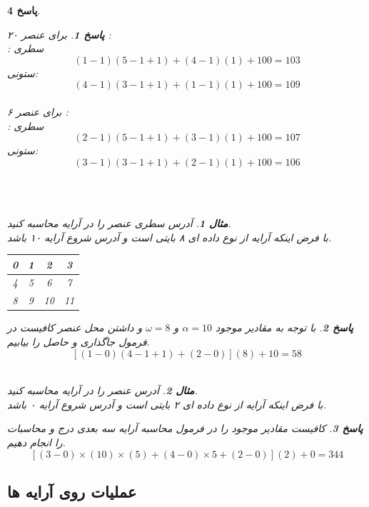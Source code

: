 \documentclass[12pt]{article}
\newtheorem{question}{مثال}[section]
\newtheorem{answer}{پاسخ}[section]
\begin{document}
\begin{answer}
\begin{answer}
برای عنصر ۲۰ :\\
سطری :
\[(1 - 1)(5 - 1 + 1) + (4 - 1)(1) + 100 = 103\]
ستونی:
\[(4 - 1)(3 - 1 + 1) + (1 - 1)(1) + 100 = 109\]\\

برای عنصر ۶ :\\
سطری :
\[(2 - 1)(5 - 1 + 1) + (3 - 1)(1) + 100 = 107\]
ستونی:
\[(3 - 1)(3 - 1 + 1) + (2- 1)(1) + 100 = 106\]\\
\end{answer}\\
\newline

\begin{question}
آدرس سطری عنصر  را در آرایه  محاسبه کنید.\\
با فرض اینکه آرایه از نوع داده ای ۸ بایتی است و آدرس شروع آرایه ۱۰ باشد.\\
\end{question}

\begin{LTR}
\begin{tabular}{|c|c|c|c|}
\hline
0 & 1 & 2 & 3  \\
\hline
4 & 5 & 6 & 7  \\
\hline
8 & 9 & 10& 11 \\
\hline
\end{tabular}
\end{LTR}

\begin{answer}
با توجه به مقادیر موجود $\alpha = 10$ و $\omega = 8$ و داشتن محل عنصر کافیست در فرمول جاگذاری و حاصل را بیابیم.\\
\[[(1 - 0)(4 - 1 + 1) + (2 - 0)](8) + 10 = 58\]\\
\end{answer}
\newline
\begin{question}
	آدرس  عنصر  را در آرایه  محاسبه کنید.\\
با فرض اینکه آرایه از نوع داده ای ۲ بایتی است و آدرس شروع آرایه ۰ باشد.
\end{question}
\begin{answer}
کافیست مقادیر موجود را در فرمول محاسبه آرایه سه بعدی درج و محاسبات را انجام دهیم.\\
\[[(3 - 0) \times (10) \times (5) + (4 - 0) \times 5 + (2 - 0 )](2) + 0 = 344\]
\end{answer}
\newpage


\subsection{\textbf{عملیات روی آرایه ها}}
\newline



\end{answer}
\end{document}
